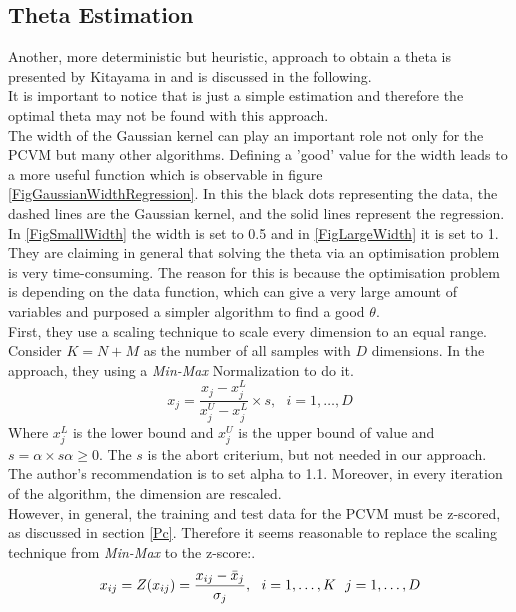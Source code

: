 \subsection{Theta Estimation}\label{InSubSecTheta}
Another, more deterministic but heuristic, approach to obtain a theta is presented by Kitayama in \cite{Kitayama.2011} and is discussed in the following.\\
It is important to notice that is just a simple estimation and therefore the optimal theta may not be found with this approach.\\
The width of the Gaussian kernel can play an important role not only for the \acs{PCVM} but many other algorithms.
Defining a 'good' value for the width leads to a more useful function which is observable in figure \ref{FigGaussianWidthRegression}.\cite{Kitayama.2011}
In this the black dots representing the data, the dashed lines are the Gaussian kernel, and the solid lines represent the regression.
In  \ref{FigSmallWidth} the width is set to 0.5 and in \ref{FigLargeWidth} it is set to 1.\newline
They are claiming in general that solving the theta via an optimisation problem is very time-consuming.
The reason for this is because the optimisation problem is depending on the data function, which can give a very large amount of variables and purposed a simpler algorithm to find a good $\theta$.\cite{Kitayama.2011}\\
First, they use a scaling technique to scale every dimension to an equal range.
Consider $K = N + M$ as the number of all samples with $D$ dimensions.
In the approach, they using a \textit{Min-Max} Normalization to do it.\cite{Kitayama.2011}
\begin{equation}
	x_j = \frac{x_j - x_j^L}{x_j^U-x_j^L} \times s, \>\>\> i=1,\dots,D 
\end{equation}
Where $x_j^L$ is the lower bound and $x_j^U$ is the upper bound of value and $s=\alpha\times s \alpha \ge 0$.
The $s$ is the abort criterium, but not needed in our approach.
The author's recommendation is to set alpha to 1.1.
Moreover, in every iteration of the algorithm, the dimension are rescaled.\\
However, in general, the training and test data for the \acs{PCVM} must be z-scored, as discussed in section \ref{Pc}.
Therefore it seems reasonable to replace the scaling technique from \textit{Min-Max} to the z-score:\cite{Mohamad.2013}.
\begin{equation}\label{EqZTrans}
x_{ij} = Z(x_{ij}) = \frac{x_{ij}-\bar{x}_j}{\sigma_j},\>\>\> i=1,\dots,K \>\>\> j=1,\dots,D
\end{equation}
